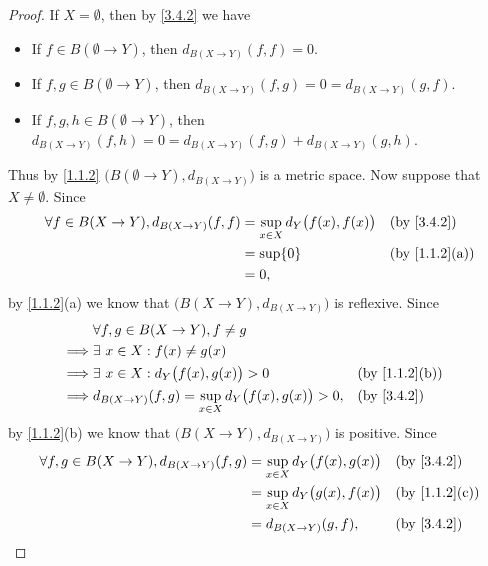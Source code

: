\begin{proof}
  If \(X = \emptyset\), then by \cref{3.4.2} we have
  \begin{itemize}
    \item If \(f \in B(\emptyset \to Y)\), then \(d_{B(X \to Y)}(f, f) = 0\).
    \item If \(f, g \in B(\emptyset \to Y)\), then \(d_{B(X \to Y)}(f, g) = 0 = d_{B(X \to Y)}(g, f)\).
    \item If \(f, g, h \in B(\emptyset \to Y)\), then \(d_{B(X \to Y)}(f, h) = 0 = d_{B(X \to Y)}(f, g) + d_{B(X \to Y)}(g, h)\).
  \end{itemize}
  Thus by \cref{1.1.2} \(\big(B(\emptyset \to Y), d_{B(X \to Y)}\big)\) is a metric space.
  Now suppose that \(X \neq \emptyset\).
  Since
  \begin{align*}
    \forall f \in B(X \to Y), d_{B(X \to Y)}(f, f) & = \sup_{x \in X} d_Y\big(f(x), f(x)\big) &  & \by{3.4.2}                  \\
                                                   & = \sup \{0\}                             &  & \text{(by \cref{1.1.2}(a))} \\
                                                   & = 0,
  \end{align*}
  by \cref{1.1.2}(a) we know that \(\big(B(X \to Y), d_{B(X \to Y)}\big)\) is reflexive.
  Since
  \begin{align*}
             & \forall f, g \in B(X \to Y), f \neq g                                                               \\
    \implies & \exists\ x \in X : f(x) \neq g(x)                                                                   \\
    \implies & \exists\ x \in X : d_Y\big(f(x), g(x)\big) > 0                     &  & \text{(by \cref{1.1.2}(b))} \\
    \implies & d_{B(X \to Y)}(f, g) = \sup_{x \in X} d_Y\big(f(x), g(x)\big) > 0, &  & \by{3.4.2}
  \end{align*}
  by \cref{1.1.2}(b) we know that \(\big(B(X \to Y), d_{B(X \to Y)}\big)\) is positive.
  Since
  \begin{align*}
    \forall f, g \in B(X \to Y), d_{B(X \to Y)}(f, g) & = \sup_{x \in X} d_Y\big(f(x), g(x)\big) &  & \by{3.4.2}                  \\
                                                      & = \sup_{x \in X} d_Y\big(g(x), f(x)\big) &  & \text{(by \cref{1.1.2}(c))} \\
                                                      & = d_{B(X \to Y)}(g, f),                  &  & \by{3.4.2}

\end{align*}
\end{proof}
